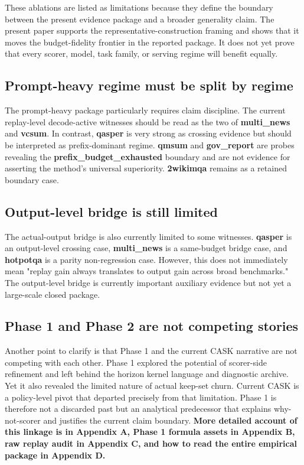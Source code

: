 These ablations are listed as limitations because they define the boundary between the present evidence package and a broader generality claim. The present paper supports the representative-construction framing and shows that it moves the budget-fidelity frontier in the reported package. It does not yet prove that every scorer, model, task family, or serving regime will benefit equally.


\subsection{Prompt-heavy regime must be split by regime}


The prompt-heavy package particularly requires claim discipline. The current replay-level decode-active witnesses should be read as the two of \textbf{multi\_news} and \textbf{vcsum}. In contrast, \textbf{qasper} is very strong as crossing evidence but should be interpreted as prefix-dominant regime. \textbf{qmsum} and \textbf{gov\_report} are probes revealing the \textbf{prefix\_budget\_exhausted} boundary and are not evidence for asserting the method's universal superiority. \textbf{2wikimqa} remains as a retained boundary case.


\subsection{Output-level bridge is still limited}


The actual-output bridge is also currently limited to some witnesses. \textbf{qasper} is an output-level crossing case, \textbf{multi\_news} is a same-budget bridge case, and \textbf{hotpotqa} is a parity non-regression case. However, this does not immediately mean "replay gain always translates to output gain across broad benchmarks." The output-level bridge is currently important auxiliary evidence but not yet a large-scale closed package.


\subsection{Phase 1 and Phase 2 are not competing stories}


Another point to clarify is that Phase 1 and the current CASK narrative are not competing with each other. Phase 1 explored the potential of scorer-side refinement and left behind the horizon kernel language and diagnostic archive. Yet it also revealed the limited nature of actual keep-set churn. Current CASK is a policy-level pivot that departed precisely from that limitation. Phase 1 is therefore not a discarded past but an analytical predecessor that explains why-not-scorer and justifies the current claim boundary. \textbf{More detailed account of this linkage is in Appendix A, Phase 1 formula assets in Appendix B, raw replay audit in Appendix C, and how to read the entire empirical package in Appendix D.}


